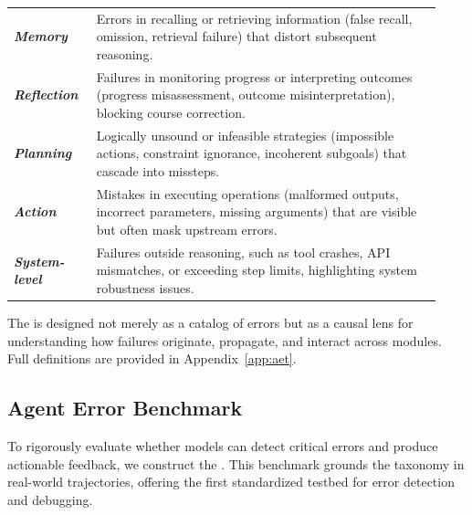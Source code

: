 
\small
\begin{tcolorbox}
\begin{tabular}{>{\bfseries}m{0.18\linewidth} m{0.75\linewidth}}

\rowcolor{orange!10} \textit{Memory} & Errors in recalling or retrieving information (false recall, omission, retrieval failure) that distort subsequent reasoning. \\

\rowcolor{blue!10} \textit{Reflection} & Failures in monitoring progress or interpreting outcomes (progress misassessment, outcome misinterpretation), blocking course correction. \\

\rowcolor{green!10} \textit{Planning} & Logically unsound or infeasible strategies (impossible actions, constraint ignorance, incoherent subgoals) that cascade into missteps. \\

\rowcolor{yellow!15} \textit{Action} & Mistakes in executing operations (malformed outputs, incorrect parameters, missing arguments) that are visible but often mask upstream errors. \\

\rowcolor{red!15} \textit{System-level} & Failures outside reasoning, such as tool crashes, API mismatches, or exceeding step limits, highlighting system robustness issues. \\

\end{tabular}
\end{tcolorbox}

The \AET{} is designed not merely as a catalog of errors but as a causal lens for understanding how failures originate, propagate, and interact across modules. Full definitions are provided in Appendix~\ref{app:aet}.

\subsection{Agent Error Benchmark}
\label{sub:bench}

To rigorously evaluate whether models can detect critical errors and produce actionable feedback, we construct the \Bench{}. This benchmark grounds the taxonomy in real-world trajectories, offering the first standardized testbed for error detection and debugging.

